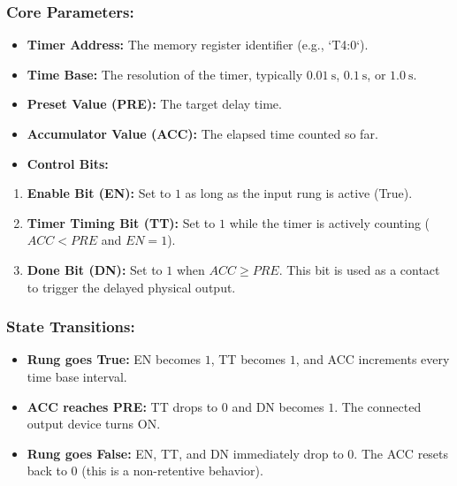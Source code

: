 \subsubsection{Core Parameters:}
\begin{itemize}
  \item   \textbf{Timer Address:} The memory register identifier (e.g., `T4:0`).
  \item   \textbf{Time Base:} The resolution of the timer, typically $0.01\ \text{s}$, $0.1\ \text{s}$, or $1.0\ \text{s}$.
  \item   \textbf{Preset Value (PRE):} The target delay time.
  \item   \textbf{Accumulator Value (ACC):} The elapsed time counted so far.
  \item   \textbf{Control Bits:}
\end{itemize}
\begin{enumerate}
  \item \textbf{Enable Bit (EN):} Set to $1$ as long as the input rung is active (True).
  \item \textbf{Timer Timing Bit (TT):} Set to $1$ while the timer is actively counting ($ACC < PRE$ and $EN = 1$).
  \item \textbf{Done Bit (DN):} Set to $1$ when $ACC \ge PRE$. This bit is used as a contact to trigger the delayed physical output.
\end{enumerate}

\subsubsection{State Transitions:}
\begin{itemize}
  \item   \textbf{Rung goes True:} EN becomes $1$, TT becomes $1$, and ACC increments every time base interval.
  \item   \textbf{ACC reaches PRE:} TT drops to $0$ and DN becomes $1$. The connected output device turns ON.
  \item   \textbf{Rung goes False:} EN, TT, and DN immediately drop to $0$. The ACC resets back to $0$ (this is a non-retentive behavior).
\end{itemize}


